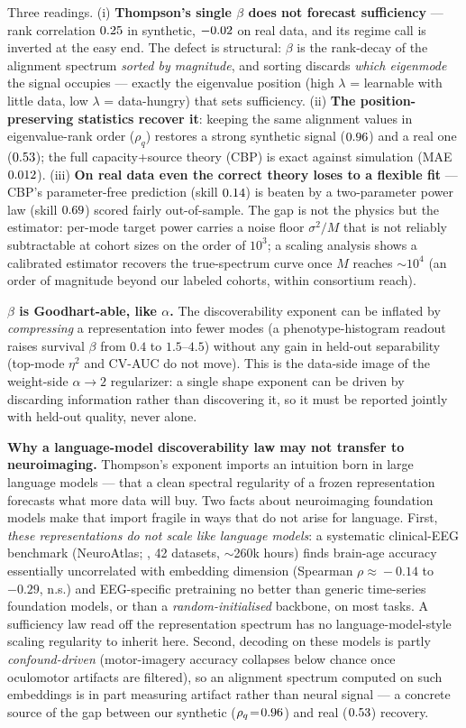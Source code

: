 Three readings. (i) \textbf{Thompson's single $\beta$ does not forecast sufficiency} --- rank
correlation $0.25$ in synthetic, $-0.02$ on real data, and its regime call is inverted at
the easy end. The defect is structural: $\beta$ is the rank-decay of the alignment spectrum \emph{sorted
by magnitude}, and sorting discards \emph{which eigenmode} the signal occupies --- exactly the
eigenvalue position (high $\lambda$ = learnable with little data, low $\lambda$ = data-hungry) that sets
sufficiency. (ii) \textbf{The position-preserving statistics recover it}: keeping the same alignment
values in eigenvalue-rank order ($\rho_q$) restores a strong synthetic signal ($0.96$) and a real
one ($0.53$); the full capacity+source theory (CBP) is exact against simulation (MAE $0.012$).
(iii) \textbf{On real data even the correct theory loses to a flexible fit} --- CBP's parameter-free
prediction (skill $0.14$) is beaten by a two-parameter power law (skill $0.69$) scored fairly
out-of-sample. The gap is not the physics but the estimator: per-mode target power carries a noise floor
$\sigma^2/M$ that is not reliably subtractable at cohort sizes on the order of $10^3$; a scaling analysis
shows a calibrated estimator recovers the true-spectrum curve once $M$ reaches $\sim10^4$ (an order of
magnitude beyond our labeled cohorts, within consortium reach).

\textbf{$\beta$ is Goodhart-able, like $\alpha$.} The discoverability exponent can be inflated by
\emph{compressing} a representation into fewer modes (a phenotype-histogram readout raises survival
$\beta$ from $0.4$ to $1.5$--$4.5$) without any gain in held-out separability (top-mode $\eta^2$ and
CV-AUC do not move). This is the data-side image of the weight-side $\alpha\!\to\!2$ regularizer:
a single shape exponent can be driven by discarding information rather than discovering it, so it must be
reported jointly with held-out quality, never alone.

\textbf{Why a language-model discoverability law may not transfer to neuroimaging.} Thompson's exponent
imports an intuition born in large language models --- that a clean spectral regularity of a frozen
representation forecasts what more data will buy. Two facts about neuroimaging foundation models make that
import fragile in ways that do not arise for language. First, \emph{these representations do not scale like
language models}: a systematic clinical-EEG benchmark (NeuroAtlas; \citealp{kontras2026neuroatlas}, 42
datasets, $\sim$260k hours) finds brain-age accuracy essentially uncorrelated with embedding dimension
(Spearman $\rho\!\approx\!-0.14$ to $-0.29$, n.s.) and EEG-specific pretraining no better than generic
time-series foundation models, or than a \emph{random-initialised} backbone, on most tasks. A
sufficiency law read off the representation spectrum has no language-model-style scaling regularity to
inherit here. Second, decoding on these models is partly \emph{confound-driven} (motor-imagery accuracy
collapses below chance once oculomotor artifacts are filtered), so an alignment spectrum computed on such
embeddings is in part measuring artifact rather than neural signal --- a concrete source of the gap between
our synthetic ($\rho_q\!=\!0.96$) and real ($0.53$) recovery.

